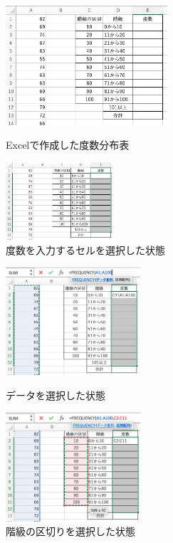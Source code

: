 \begin{figure}[htbp]
    \begin{minipage}{0.5\hsize}
        \centering
        \includegraphics[width=6cm]{chap1/before_freq.png}
        \caption{Excelで作成した度数分布表}
        \label{fig:before_freq}
    \end{minipage}
    \begin{minipage}{0.5\hsize}
        \centering
        \includegraphics[width=4cm]{chap1/select_cells_freq.png}
        \caption{度数を入力するセルを選択した状態}
        \label{fig:select_cells_freq}
    \end{minipage}
\end{figure}


\begin{figure}[htbp]
    \begin{minipage}{0.5\hsize}
        \centering
        \includegraphics[width=5cm]{chap1/select_data_freq.png}
        \caption{データを選択した状態}
        \label{fig:select_data_freq}
    \end{minipage}
    \begin{minipage}{0.5\hsize}
        \centering
        \includegraphics[width=5cm]{chap1/select_classes_freq.png}
        \caption{階級の区切りを選択した状態}
        \label{fig:select_classes_freq}
    \end{minipage}
\end{figure}


